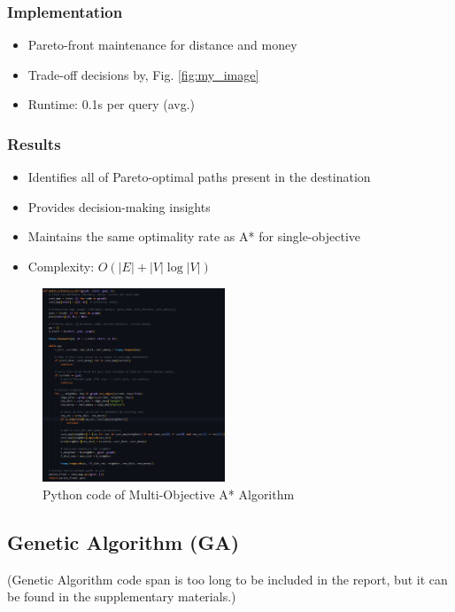 \documentclass[conference]{IEEEtran}
\begin{document}
\subsubsection{Implementation}
\begin{itemize}
    \item Pareto-front maintenance for distance and money
    \item Trade-off decisions by, Fig. \ref{fig:my_image}
    \item Runtime: 0.1s per query (avg.)
\end{itemize}

\subsubsection{Results}
\begin{itemize}
    \item Identifies all of Pareto-optimal paths present in the destination
    \item Provides decision-making insights
    \item Maintains the same optimality rate as A* for single-objective
    \item Complexity: $O(|E| + |V|\log|V|)$
\end{itemize}

\begin{figure}[htbp]
    \centering
    \includegraphics[width=0.486\textwidth]{multiAstar.png} %
    \caption{Python code of Multi-Objective A* Algorithm}
    \label{fig:multiastar}
\end{figure}

\subsection{Genetic Algorithm (GA)}
(Genetic Algorithm code span is too long to be included in the report, but it can be found in the supplementary materials.)
\end{document}
